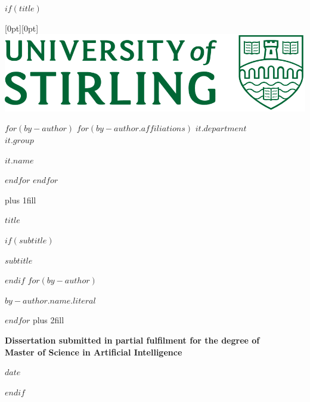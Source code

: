 
$if(title)$

\cleardoublepage
\thispagestyle{empty}

\hspace{10cm} %
\raisebox{0.75cm}[0pt][0pt]{\includegraphics[width=0.4\linewidth]{Latex_Definitions/uos_logo.png}}

\begin{center}

$for(by-author)$
$for(by-author.affiliations)$
{\Large \textit{$it.department$} \\}
{\Large \textit{$it.group$} \\}
{\Large \textit{$it.name$} \par}
$endfor$
$endfor$

\hbox{}\vskip 0cm plus 1fill
{\LARGE\bfseries $title$ \par}
$if(subtitle)$
{\Large\bfseries $subtitle$ \par}
$endif$
\vspace{10ex}
$for(by-author)$
{\Large\bfseries $by-author.name.literal$ \par}
$endfor$
\vskip 0.5cm plus 2fill

{\bfseries Dissertation submitted in partial fulfilment for the degree of \\
Master of Science in Artificial Intelligence \par}
\vspace{2ex}
{\bfseries $date$ \par}

\end{center}
$endif$

\clearpage
{}
\setcounter{page}{1}
